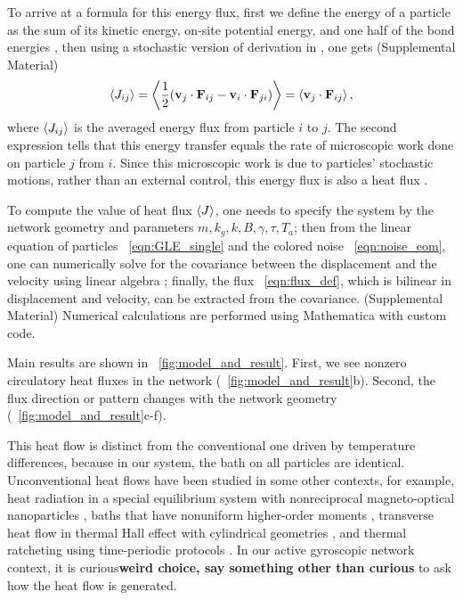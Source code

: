 \documentclass[
 preprint,
 preprintnumbers,
 amsmath,amssymb,
 aps,
 pre,
 longbibliography,
 10pt, twocolumn
]{revtex4-1}
\begin{document}
To arrive at a formula for this energy flux, first we define the energy of a particle as the sum of its kinetic energy, on-site potential energy, and one half of the bond energies \cite{Lepri2003ThermalLattices}, then using a stochastic version of derivation in \cite{Lepri2003ThermalLattices}, one gets (Supplemental Material)
\begin{equation} \label{eqn:flux_def}
\expval{J_{ij}} = \expval{\frac{1}{2} (\mathbf{v}_j \cdot \mathbf{F}_{ij} - \mathbf{v}_i \cdot \mathbf{F}_{ji})}
= \expval{\mathbf{v}_j \cdot \mathbf{F}_{ij}},
\end{equation}
where $\expval{J_{ij}}$ is the averaged energy flux from particle $i$ to $j$.
The second expression tells that this energy transfer equals the rate of microscopic work done on particle $j$ from $i$.
Since this microscopic work is due to particles' stochastic motions, rather than an external control, this energy flux is also a heat flux \cite{Sekimoto1998LangevinThermodynamics,Lepri2003ThermalLattices}.

To compute the value of heat flux $\expval{J}$, 
one needs to specify the system by the network geometry and parameters $m, k_g, k, B, \gamma, \tau, T_a$;
then from the linear equation of particles \eqnname~\eqref{eqn:GLE_single} and the colored noise \eqnname~\eqref{eqn:noise_eom}, one can numerically solve for the covariance between the displacement and the velocity using linear algebra \cite{Gardiner2009TheEquations,Ceriotti2010Colored-NoiseCarte};
finally, the flux \eqnname~\eqref{eqn:flux_def}, which is bilinear in displacement and velocity, can be extracted from the covariance.
(Supplemental Material)
Numerical calculations are performed using Mathematica \cite{WolframResearch2018Mathematica11.3} with custom code.

Main results are shown in \figurename~\ref{fig:model_and_result}. First, we see nonzero circulatory heat fluxes in the network (\figurename~\ref{fig:model_and_result}b). Second, the flux direction or pattern changes with the network geometry (\figurename~\ref{fig:model_and_result}c-f).

This heat flow is distinct from the conventional one driven by temperature differences, because in our system, the bath on all particles are identical. 
Unconventional heat flows have been studied in some other contexts, for example, heat radiation in a special equilibrium system with nonreciprocal magneto-optical nanoparticles \cite{Zhu2016PersistentTransfer}, baths that have nonuniform higher-order moments \cite{Kanazawa2013HeatFluctuations}, transverse heat flow in thermal Hall effect with cylindrical geometries \cite{Nomura2012Cross-correlatedSuperfluids,Zhang2016BerryEffects}, and thermal ratcheting using time-periodic protocols \cite{Li2008RatchetingBias,Ren2010EmergenceBias,Ren2012GeometricSystems}.
In our active gyroscopic network context, it is curious{\bf weird choice, say something other than curious} to ask how the heat flow is generated.
\end{document}
